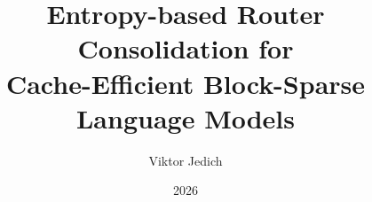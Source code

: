 \documentclass[11pt]{article}
\begin{document}
\title{Entropy-based Router Consolidation for\\
       Cache-Efficient Block-Sparse Language Models}
\author{Viktor Jedich}
\date{2026}
\maketitle

\begin{abstract}

\end{abstract}










\end{document}
